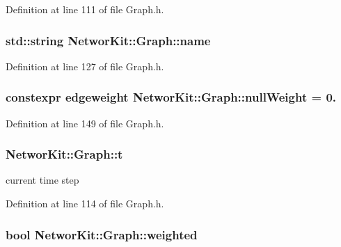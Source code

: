 Definition at line 111 of file Graph.\-h.

\hypertarget{class_networ_kit_1_1_graph_aad1c9901bb8b7493df628469be54300a}{
\subsubsection[{name}]{\setlength{\rightskip}{0pt plus 5cm}std\-::string Networ\-Kit\-::\-Graph\-::name\hspace{0.3cm}{\ttfamily [protected]}}}\label{class_networ_kit_1_1_graph_aad1c9901bb8b7493df628469be54300a}


Definition at line 127 of file Graph.\-h.

\hypertarget{class_networ_kit_1_1_graph_a4b97f82f62865c47a7a2e1309f90c676}{
\subsubsection[{null\-Weight}]{\setlength{\rightskip}{0pt plus 5cm}constexpr {\bf edgeweight} Networ\-Kit\-::\-Graph\-::null\-Weight = 0.\hspace{0.3cm}{\ttfamily [static]}}}\label{class_networ_kit_1_1_graph_a4b97f82f62865c47a7a2e1309f90c676}


Definition at line 149 of file Graph.\-h.

\hypertarget{class_networ_kit_1_1_graph_a94f839ffb30401a9b37cdf2018c84c63}{
\subsubsection[{t}]{ Networ\-Kit\-::\-Graph\-::t\hspace{0.3cm}{\ttfamily [protected]}}}\label{class_networ_kit_1_1_graph_a94f839ffb30401a9b37cdf2018c84c63}


current time step 



Definition at line 114 of file Graph.\-h.

\hypertarget{class_networ_kit_1_1_graph_a9c578217708fd4f3652ea92a07dfd5be}{
\subsubsection[{weighted}]{\setlength{\rightskip}{0pt plus 5cm}bool Networ\-Kit\-::\-Graph\-::weighted\hspace{0.3cm}{\ttfamily [protected]}}}\label{class_networ_kit_1_1_graph_a9c578217708fd4f3652ea92a07dfd5be}


